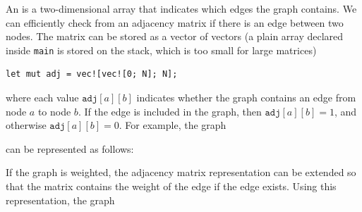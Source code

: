 An  is a two-dimensional array
that indicates which edges the graph contains.
We can efficiently check from an adjacency matrix
if there is an edge between two nodes.
The matrix can be stored as a vector of vectors
(a plain array declared inside \texttt{main}
is stored on the stack, which is too small for large matrices)
\begin{lstlisting}
let mut adj = vec![vec![0; N]; N];
\end{lstlisting}
where each value $\texttt{adj}[a][b]$ indicates
whether the graph contains an edge from
node $a$ to node $b$.
If the edge is included in the graph,
then $\texttt{adj}[a][b]=1$,
and otherwise $\texttt{adj}[a][b]=0$.
For example, the graph
\begin{center}
\end{center}
can be represented as follows:
\begin{center}
\end{center}

If the graph is weighted, the adjacency matrix
representation can be extended so that
the matrix contains the weight of the edge
if the edge exists.
Using this representation, the graph

